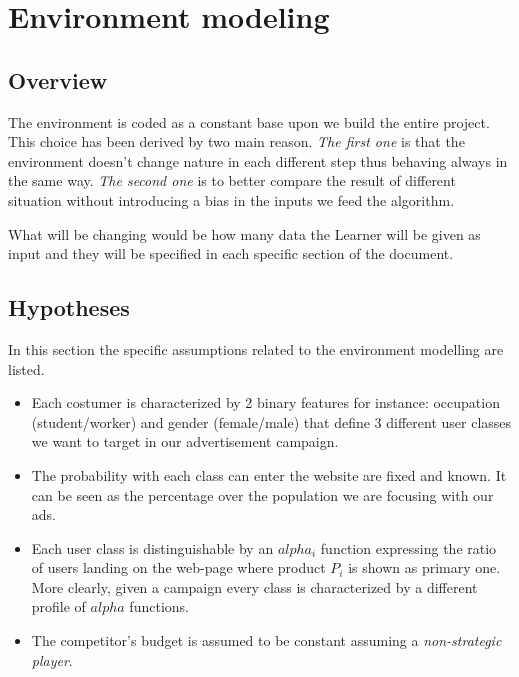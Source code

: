 

\chapter{Environment modeling}

\section{Overview}
\label{chap:env_model}
The environment is coded as a constant base upon we build the entire project. This choice has been derived by two main reason. \textit{The first one} is that the environment doesn't change nature in each different step thus behaving always in the same way. \textit{The second one} is to better compare the result of different situation without introducing a bias in the inputs we feed the algorithm.

What will be changing would be how many data the Learner will be given as input and they will be specified in each specific section of the document.

\section{Hypotheses}
 \label{sec:env_hypoteses}

In this section the specific assumptions related to the environment modelling are listed.

\begin{itemize}
    \item Each costumer is characterized by 2 binary features for instance: occupation (student/worker) and gender (female/male) that define 3 different user classes we want to target in our advertisement campaign.
    \item The probability with each class can enter the website are fixed and known. It can be seen as the percentage over the population we are focusing with our ads.
    \item Each user class is distinguishable by an $alpha_i$ function expressing the ratio of users landing on the web-page where product $P_i$ is shown as primary one. More clearly, given a campaign every class is characterized by a different profile of $alpha$ functions.
    \item The competitor's budget is assumed to be constant assuming a \textit{non-strategic player}.
 \end{itemize}

